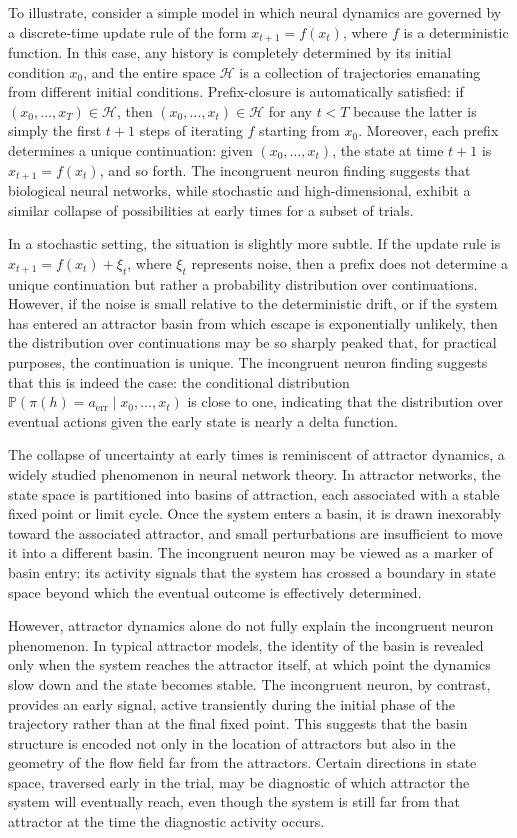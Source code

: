 \documentclass[11pt]{article}
\newcommand{\histories}{\mathcal{H}}
\newcommand{\prob}{\mathbb{P}}
\begin{document}
To illustrate, consider a simple model in which neural dynamics are governed by a discrete-time update rule of the form $x_{t+1} = f(x_t)$, where $f$ is a deterministic function. In this case, any history is completely determined by its initial condition $x_0$, and the entire space $\histories$ is a collection of trajectories emanating from different initial conditions. Prefix-closure is automatically satisfied: if $(x_0, \ldots, x_T) \in \histories$, then $(x_0, \ldots, x_t) \in \histories$ for any $t < T$ because the latter is simply the first $t+1$ steps of iterating $f$ starting from $x_0$. Moreover, each prefix determines a unique continuation: given $(x_0, \ldots, x_t)$, the state at time $t+1$ is $x_{t+1} = f(x_t)$, and so forth. The incongruent neuron finding suggests that biological neural networks, while stochastic and high-dimensional, exhibit a similar collapse of possibilities at early times for a subset of trials.

In a stochastic setting, the situation is slightly more subtle. If the update rule is $x_{t+1} = f(x_t) + \xi_t$, where $\xi_t$ represents noise, then a prefix does not determine a unique continuation but rather a probability distribution over continuations. However, if the noise is small relative to the deterministic drift, or if the system has entered an attractor basin from which escape is exponentially unlikely, then the distribution over continuations may be so sharply peaked that, for practical purposes, the continuation is unique. The incongruent neuron finding suggests that this is indeed the case: the conditional distribution $\prob(\pi(h) = a_{\text{err}} \mid x_0, \ldots, x_t)$ is close to one, indicating that the distribution over eventual actions given the early state is nearly a delta function.

The collapse of uncertainty at early times is reminiscent of attractor dynamics, a widely studied phenomenon in neural network theory. In attractor networks, the state space is partitioned into basins of attraction, each associated with a stable fixed point or limit cycle. Once the system enters a basin, it is drawn inexorably toward the associated attractor, and small perturbations are insufficient to move it into a different basin. The incongruent neuron may be viewed as a marker of basin entry: its activity signals that the system has crossed a boundary in state space beyond which the eventual outcome is effectively determined.

However, attractor dynamics alone do not fully explain the incongruent neuron phenomenon. In typical attractor models, the identity of the basin is revealed only when the system reaches the attractor itself, at which point the dynamics slow down and the state becomes stable. The incongruent neuron, by contrast, provides an early signal, active transiently during the initial phase of the trajectory rather than at the final fixed point. This suggests that the basin structure is encoded not only in the location of attractors but also in the geometry of the flow field far from the attractors. Certain directions in state space, traversed early in the trial, may be diagnostic of which attractor the system will eventually reach, even though the system is still far from that attractor at the time the diagnostic activity occurs.
\end{document}
